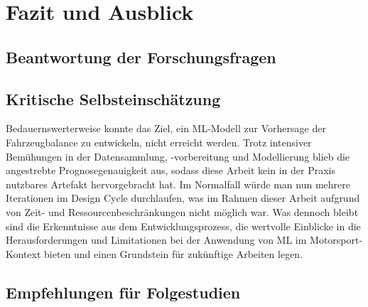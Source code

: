 \chapter{Fazit und Ausblick}
\section{Beantwortung der Forschungsfragen}
\section{Kritische Selbsteinschätzung}
Bedauernswerterweise konnte das Ziel, ein ML-Modell zur Vorhersage der Fahrzeugbalance zu entwickeln, nicht erreicht werden. Trotz intensiver Bemühungen in der Datensammlung, -vorbereitung und Modellierung blieb die angestrebte Prognosegenauigkeit aus, sodass diese Arbeit kein in der Praxis nutzbares Artefakt hervorgebracht hat. Im Normalfall würde man nun mehrere Iterationen im Design Cycle durchlaufen, was im Rahmen dieser Arbeit aufgrund von Zeit- und Ressourcenbeschränkungen nicht möglich war.
Was dennoch bleibt sind die Erkenntnisse aus dem Entwicklungsprozess, die wertvolle Einblicke in die Herausforderungen und Limitationen bei der Anwendung von ML im Motorsport-Kontext bieten und einen Grundstein für zukünftige Arbeiten legen.
\section{Empfehlungen für Folgestudien}